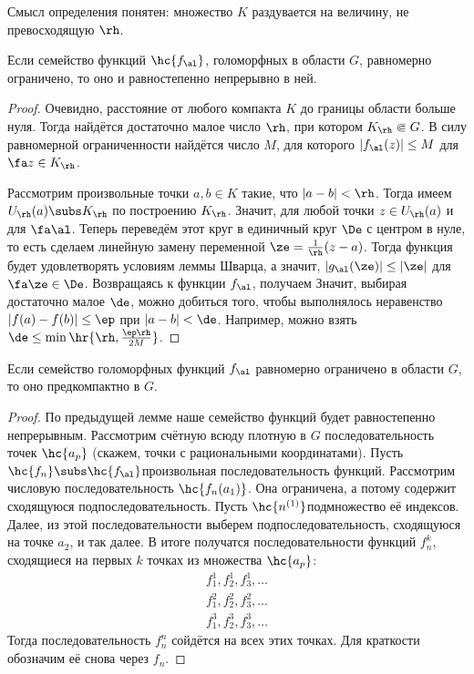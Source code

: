 \documentclass[a4paper]{article}
\begin{document}
\begin{theorem}
Смысл определения понятен: множество $K$ раздувается на величину, не превосходящую $\rh$.

\begin{lemma}
Если семейство функций $\hc{f_\al}$, голоморфных в области $G$, равномерно ограничено, то оно и равностепенно
непрерывно в ней.
\end{lemma}
\begin{proof}
Очевидно, расстояние от любого компакта $K$ до границы области больше нуля. Тогда найдётся достаточно малое число $\rh$,
при котором $K_\rh \Subset G$. В силу равномерной ограниченности найдётся число $M$, для которого $|f_\al(z)|\le M$ для $\fa z \in K_\rh$.

Рассмотрим произвольные точки $a,b\in K$ такие, что $|a-b|<\rh$. Тогда имеем $U_\rh(a) \subs K_\rh$ по построению $K_\rh$.
Значит,
для любой точки $z \in U_\rh(a)$ и для $\fa \al$. Теперь переведём этот круг в единичный круг $\De$ с центром
в нуле, то есть сделаем линейную замену переменной $\ze = \frac{1}{\rh}(z-a)$. Тогда функция
будет удовлетворять условиям леммы Шварца, а значит, $|g_\al(\ze)| \le |\ze|$ для $\fa \ze \in \De$. Возвращаясь
к функции $f_\al$, получаем
Значит, выбирая достаточно малое $\de$, можно добиться того, чтобы выполнялось неравенство $|f(a)-f(b)|\le \ep$ при $|a-b|<\de$.
Например, можно взять $\de \le \min \hr{\rh, \frac{\ep\rh}{2M}}$.
\end{proof}

\begin{theorem}
Если семейство голоморфных функций $f_\al$ равномерно ограничено в области $G$, то оно предкомпактно в $G$.
\end{theorem}
\begin{proof}
По предыдущей лемме наше семейство функций будет равностепенно непрерывным.  Рассмотрим счётную всюду плотную
в $G$ последовательность точек $\hc{a_p}$ (скажем, точки с рациональными координатами).
Пусть $\hc{f_n}\subs \hc{f_\al}$\т произвольная последовательность функций. Рассмотрим числовую
последовательность $\hc{f_n(a_1)}$. Она ограничена, а потому содержит сходящуюся подпоследовательность.
Пусть $\hc{n^{(1)}}$\т подмножество её индексов. Далее, из этой последовательности выберем подпоследовательность,
сходящуюся на точке $a_2$, и так далее. В итоге получатся последовательности функций $f_n^{k}$, сходящиеся на первых $k$
точках из множества $\hc{a_p}$:
\begin{align*}
f_1^1, f_2^1, f_3^1, \ldots\\
f_1^2, f_2^2, f_3^2, \ldots\\
f_1^3, f_2^3, f_3^3, \ldots
\end{align*}
Тогда последовательность $f_n^n$ сойдётся на всех этих точках. Для краткости обозначим её снова через $f_n$.


\end{proof}
\end{theorem}
\end{document}
